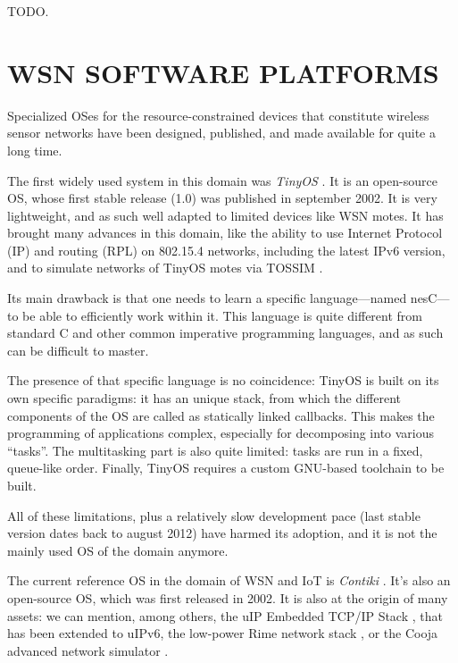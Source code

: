 \documentclass[a4paper,twoside]{article}
\begin{document}
TODO.



\section{\uppercase{WSN Software platforms}}

Specialized OSes for the resource-constrained devices that constitute
wireless sensor networks have been designed, published, and made available
for quite a long time.


The first widely used system in this domain was \emph{TinyOS} \cite{TinyOS}.
It is an open-source OS, whose first stable release (1.0) was published in
september 2002. It is very lightweight, and as such well adapted to limited
devices like WSN motes.  It has brought many advances in this domain, like
the ability to use Internet Protocol (IP) and routing (RPL) on 802.15.4
networks, including the latest IPv6 version, and to simulate networks
of TinyOS motes via TOSSIM \cite{TOSSIM}.

Its main drawback is that one needs to learn a specific language---named
nesC---to be able to efficiently work within it. This language is quite
different from standard C and other common imperative programming languages,
and as such can be difficult to master.

The presence of that specific language is no coincidence: TinyOS is built
on its own specific paradigms: it has an unique stack, from which the
different components of the OS are called as statically linked callbacks.
This makes the programming of applications complex, especially for
decomposing into various ``tasks''. The multitasking part is also
quite limited: tasks are run in a fixed, queue-like order. Finally,
TinyOS requires a custom GNU-based toolchain to be built.

All of these limitations, plus a relatively slow development pace (last
stable version dates back to august 2012) have harmed its adoption,
and it is not the mainly used OS of the domain anymore.


The current reference OS in the domain of WSN and IoT is \emph{Contiki}
\cite{ContikiOS}. It's also an open-source OS, which was first released
in 2002. It is also at the origin of many assets: we can mention, among
others, the uIP Embedded TCP/IP Stack \cite{uip}, that has been extended
to uIPv6, the low-power Rime network stack \cite{Rime}, or the Cooja advanced
network simulator \cite{Cooja}.
\end{document}

